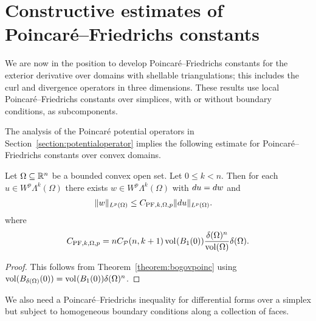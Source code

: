 \documentclass[10pt,a4paper]{article}
\begin{document}
\section{Constructive estimates of Poincar\'e--Friedrichs constants}\label{section:poincarefriedrichs}

We are now in the position to develop Poincar\'e--Friedrichs constants for the exterior derivative over domains with shellable triangulations; this includes the curl and divergence operators in three dimensions. 
These results use local Poincar\'e--Friedrichs constants over simplices, 
with or without boundary conditions, as subcomponents. 

The analysis of the Poincar\'e potential operators in Section~\ref{section:potentialoperator}
implies the following estimate for Poincar\'e--Friedrichs constants over convex domains. 

\begin{lemma}\label{lemma:PFexteriorsimplex}
    Let $\Omega \subseteq {\mathbb R}^{n}$ be a bounded convex open set. 
    Let $0 \leq k < n$. 
    Then for each $u \in W^{p}\Lambda^{k}(\Omega)$ 
    there exists $w \in W^{p}\Lambda^{k}(\Omega)$ 
    with $d u = d w$ and 
    \begin{align*}
        \| w \|_{L^{p}(\Omega)}
        &
        \leq 
        C_{{{\rm PF}},k,\Omega,p}
        \| d u \|_{L^{p}(\Omega)}
        .
    \end{align*}
    where 
    \begin{align*}
        C_{{{\rm PF}},k,\Omega,p} 
        = 
        n C_{{\mathcal P}}(n,k+1) 
        \operatorname{vol}_{}(B_1(0)) 
        \frac{ {\delta}(\Omega)^{n} }{ \operatorname{vol}(\Omega) } 
        {\delta}(\Omega)
        .
    \end{align*}
\end{lemma}
\begin{proof}
    This follows from Theorem~\ref{theorem:bogovpoinc} using $\operatorname{vol}(B_{{\delta}(\Omega)}(0)) = \operatorname{vol}_{}(B_1(0)) {\delta}(\Omega)^{n}$.
\end{proof}

We also need a Poincar\'e--Friedrichs inequality for differential forms over a simplex but subject to homogeneous boundary conditions along a collection of faces. 
\end{document}
